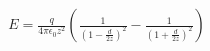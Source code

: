 \documentclass[preview]{standalone}
\begin{document}
\begin{align*}
E = {\frac{q}{4\pi\epsilon_{0}z^{2}}} \left(\frac{1}{(1 - \frac{d}{2z})^{2}} - \frac{1}{(1 + \frac{d}{2z})^{2}}\right)
\end{align*}
\end{document}

